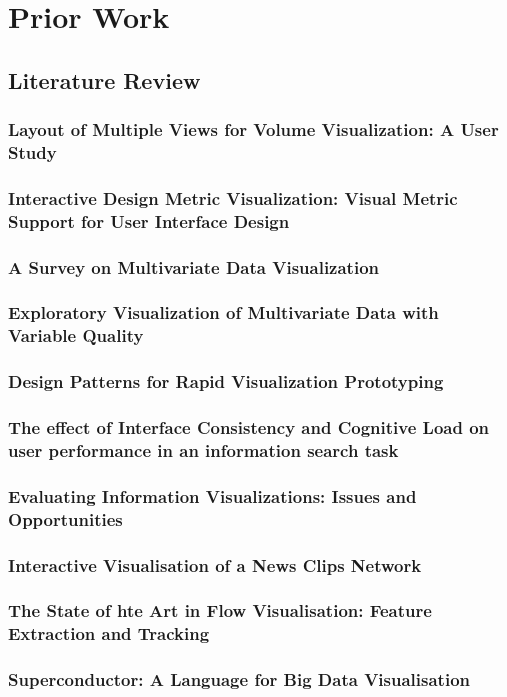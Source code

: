 \documentclass[11pt
              , a4paper
              , twoside
              , openright
              ]{report}
\begin{document}
\chapter{Prior Work}
\section{Literature Review}
\subsection{Layout of Multiple Views for Volume Visualization: A User Study}
\subsection{Interactive Design Metric Visualization: Visual Metric Support for User Interface Design}
\subsection{A Survey on Multivariate Data Visualization}
\subsection{Exploratory Visualization of Multivariate Data with Variable Quality}
\subsection{Design Patterns for Rapid Visualization Prototyping}
\subsection{The effect of Interface Consistency and Cognitive Load on user performance in an information search task}
\subsection{Evaluating Information Visualizations: Issues and Opportunities}
\subsection{Interactive Visualisation of a News Clips Network}
\subsection{The State of hte Art in Flow Visualisation: Feature Extraction and Tracking}
\subsection{Superconductor: A Language for Big Data Visualisation}
\end{document}
